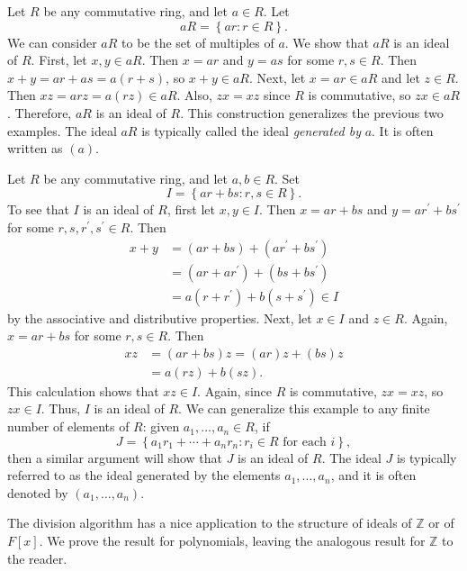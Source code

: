 \begin{example}
Let $R$ be any commutative ring, and let $a\in R$. Let
\[
aR=\left\{  ar:r\in R\right\}  .
\]
We can consider $aR$ to be the set of multiples of $a$. We show that $aR$ is
an ideal of $R$. First, let $x,y\in aR$. Then $x=ar$ and $y=as$ for some
$r,s\in R$. Then $x+y=ar+as=a(r+s)$, so $x+y\in aR$. Next, let $x=ar\in aR$
and let $z\in R$. Then $xz=arz=a(rz)\in aR$. Also, $zx=xz$ since $R$ is
commutative, so $zx\in aR$. Therefore, $aR$ is an ideal of $R$. This
construction generalizes the previous two examples. The ideal $aR$ is
typically called the ideal
%
\emph{generated by} $a$. It is often written as $(a)$.
\end{example}

\begin{example}
Let $R$ be any commutative ring, and let $a,b\in R$. Set
\[
I=\left\{  ar+bs:r,s\in R\right\}  .
\]
To see that $I$ is an ideal of $R$, first let $x,y\in I$. Then $x=ar+bs$ and
$y=ar^{\prime}+bs^{\prime}$ for some $r,s,r^{\prime},s^{\prime}\in R$. Then
\begin{align*}
x+y  &  =(ar+bs)+(ar^{\prime}+bs^{\prime})\\
&  =(ar+ar^{\prime})+(bs+bs^{\prime})\\
&  =a(r+r^{\prime})+b(s+s^{\prime})\in I
\end{align*}
by the associative and distributive properties. Next, let $x\in I$ and $z\in
R$. Again, $x=ar+bs$ for some $r,s\in R$. Then
\begin{align*}
xz  &  =(ar+bs)z=(ar)z+(bs)z\\
&  =a(rz)+b(sz).
\end{align*}
This calculation shows that $xz\in I$. Again, since $R$ is commutative,
$zx=xz$, so $zx\in I$. Thus, $I$ is an ideal of $R$. We can generalize this
example to any finite number of elements of $R$: given $a_{1},\ldots,a_{n}\in
R$, if
\[
J=\left\{  a_{1}r_{1}+\cdots+a_{n}r_{n}:r_{i}\in R\text{ for each }i\right\}
,
\]
then a similar argument will show that $J$ is an ideal of $R$. The ideal $J$
is typically referred to as the ideal generated by the elements $a_{1}%
,\ldots,a_{n}$, and it is often denoted by $(a_{1},\ldots,a_{n})$.
\end{example}

The division algorithm has a nice application to the structure of ideals of
$\mathbb{Z}$ or of $F[x]$. We prove the result for polynomials, leaving the
analogous result for $\mathbb{Z}$ to the reader.

